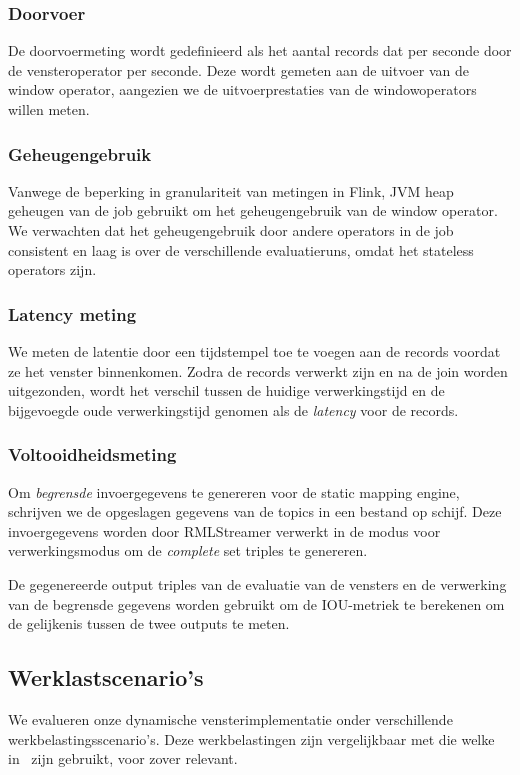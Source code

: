 \subsubsection{Doorvoer}%
\label{ssub:Throughput}
De doorvoermeting wordt gedefinieerd als het aantal records dat per seconde door de 
vensteroperator per seconde. 
Deze wordt gemeten aan de uitvoer van de window operator, aangezien we de 
uitvoerprestaties van de windowoperators willen meten. 


\subsubsection{Geheugengebruik}%
\label{ssub:Memory usage}
Vanwege de beperking in granulariteit van metingen in Flink, 
JVM heap geheugen van de job gebruikt om het geheugengebruik van de window 
operator. We verwachten dat het geheugengebruik door andere operators in de job 
consistent en laag is over de verschillende evaluatieruns, omdat het stateless operators zijn.

\subsubsection{Latency meting}%
\label{ssub:Latency measurement}
We meten de latentie door een tijdstempel toe te voegen aan de 
records voordat ze het venster binnenkomen. 
Zodra de records verwerkt zijn en na de join worden uitgezonden, wordt het verschil 
tussen de huidige verwerkingstijd en de bijgevoegde oude verwerkingstijd 
genomen als de \emph{latency} voor de records. 

\subsubsection{Voltooidheidsmeting}%
\label{ssub:Completeness measurement}
Om \emph{begrensde} invoergegevens te genereren voor 
de static mapping engine, schrijven we de opgeslagen gegevens van de topics 
in een bestand op schijf. Deze invoergegevens worden door RMLStreamer verwerkt in de modus voor 
verwerkingsmodus om de \emph{complete} set triples te genereren. 

De gegenereerde output triples van de evaluatie van de vensters en de verwerking van de begrensde gegevens worden 
gebruikt om de IOU-metriek te berekenen om de gelijkenis tussen de twee outputs te meten.    



\subsection{Werklastscenario's}
\label{sec:workload}
We evalueren onze dynamische vensterimplementatie onder verschillende werkbelastingsscenario's. 
Deze werkbelastingen zijn vergelijkbaar met die welke in~\cite{evalution_of_spe} zijn gebruikt, voor zover relevant.

